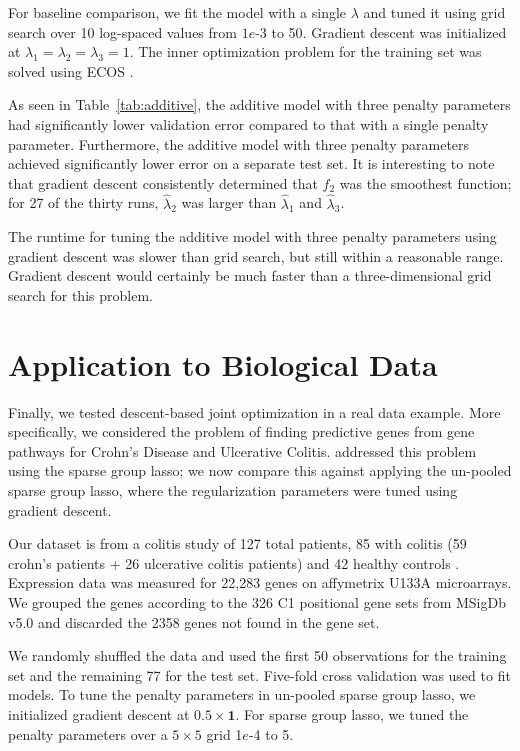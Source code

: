 \documentclass{statsoc}
\begin{document}
For baseline comparison, we fit the model with a single $\lambda$ and tuned it using grid search over 10 log-spaced values from $1e$-3 to 50. Gradient descent was initialized at $\lambda_1=\lambda_2=\lambda_3=1$. The inner optimization problem for the training set was solved using ECOS \citep{Domahidi2013ecos}.

As seen in Table~\ref{tab:additive}, the additive model with three penalty parameters had significantly lower validation error compared to that with a single penalty parameter. Furthermore, the additive model with three penalty parameters achieved significantly lower error on a separate test set. It is interesting to note that gradient descent consistently determined that $f_2$ was the smoothest function; for 27 of the thirty runs, $\hat{\lambda}_2$ was larger than $\hat{\lambda}_1$ and $\hat{\lambda}_3$.

The runtime for tuning the additive model with three penalty parameters using gradient descent was slower than grid search, but still within a reasonable range. Gradient descent would certainly be much faster than a three-dimensional grid search for this problem.

\section{Application to Biological Data}\label{realDataResults}
Finally, we tested descent-based joint optimization in a real data example. More specifically, we considered the problem of finding predictive genes from gene pathways for Crohn's Disease and Ulcerative Colitis. \citet{simon2013sparse} addressed this problem using the sparse group lasso; we now compare this against applying the un-pooled sparse group lasso, where the regularization parameters were tuned using gradient descent.

Our dataset is from a colitis study of 127 total patients, 85 with colitis (59 crohn's patients + 26 ulcerative colitis patients) and 42 healthy controls \citep{burczynski2006molecular}. Expression data was measured for 22,283 genes on affymetrix U133A microarrays. We grouped the genes according to the 326 C1 positional gene sets from MSigDb v5.0 \citep{subramanian2005gene} and discarded the 2358 genes not found in the gene set.

We randomly shuffled the data and used the first 50 observations for the training set and the remaining 77 for the test set. Five-fold cross validation was used to fit models. To tune the penalty parameters in un-pooled sparse group lasso, we initialized gradient descent at $0.5 \times \boldsymbol 1$. For sparse group lasso, we tuned the penalty parameters over a $5 \times 5$ grid 1$e$-4 to 5.
\end{document}
